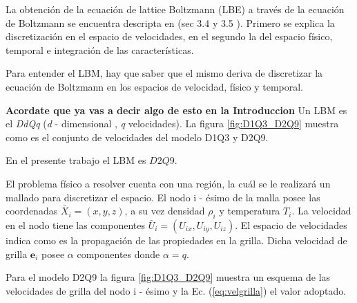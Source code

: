La obtención de la ecuación de lattice Boltzmann (LBE) a través de la ecuación de Boltzmann se encuentra descripta en \cite{kruger2017lattice} (sec 3.4 y 3.5 ). Primero se explica la discretización en el espacio de velocidades, en el segundo la del espacio físico, temporal e integración de las características.

Para entender el LBM, hay que saber que el mismo deriva de discretizar la ecuación de Boltzmann en los espacios de velocidad, físico y temporal.  

\textbf{Acordate que ya vas a decir algo de esto en la Introduccion}
Un LBM es el \textit{DdQq} (\textit{d} - dimensional , \textit{q} velocidades). La figura \ref{fig:D1Q3_D2Q9} muestra como es el conjunto de velocidades del modelo D1Q3 y D2Q9.

En el presente trabajo el LBM es $D2Q9$. 

El problema físico a resolver cuenta con una región, la cuál se le realizará un mallado para discretizar el espacio. El nodo i - ésimo de la malla posee las coordenadas ${\bar{X}}_{i} = (x,y,z)$, a su vez densidad $\rho_{i}$ y temperatura $T_{i}$. La velocidad en el nodo tiene las componentes ${\bar{U}}_{i} = ({U}_{ix},{U}_{iy},{U}_{iz})$. El espacio de velocidades indica como es la propagación de las propiedades en la grilla. Dicha velocidad de grilla $\mathbf{e}_{i}$ posee $\alpha$ componentes donde $\alpha = q $. 

Para el modelo D2Q9 la figura \ref{fig:D1Q3_D2Q9} muestra un esquema de las velocidades de grilla del nodo i - ésimo y la Ec. (\ref{eq:velgrilla}) el valor adoptado.


